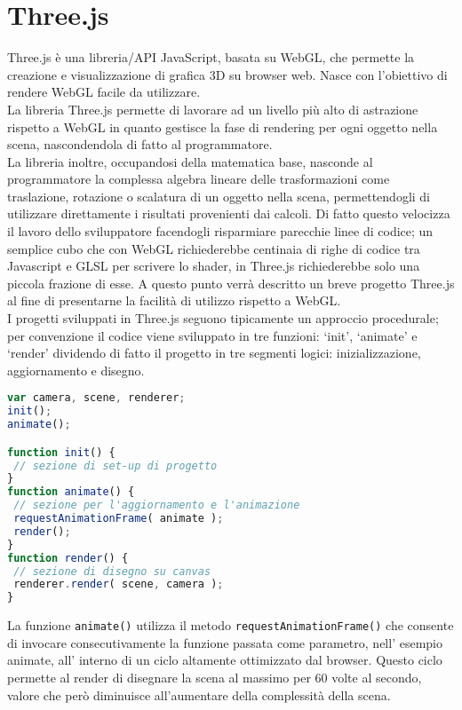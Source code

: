 \section{Three.js}
\label{sec:chapter_tecnologie_abilitanti_threejs}

Three.js è una libreria/API JavaScript, basata su WebGL, che permette la creazione e visualizzazione di grafica 3D su browser web. Nasce con l’obiettivo di rendere WebGL facile da utilizzare. \cite{webgl9}
\\
La libreria Three.js permette di lavorare ad un livello più alto di astrazione rispetto a WebGL in quanto gestisce la fase di rendering per ogni oggetto nella scena, nascondendola di fatto al programmatore.
\\
La libreria inoltre, occupandosi della matematica base, nasconde al programmatore la complessa algebra lineare delle trasformazioni come traslazione, rotazione o scalatura di un oggetto nella scena, permettendogli di utilizzare direttamente i risultati provenienti dai calcoli.
Di fatto questo velocizza il lavoro dello sviluppatore facendogli risparmiare parecchie linee di codice; un semplice cubo che con WebGL richiederebbe centinaia di righe di codice tra Javascript e GLSL per scrivere lo shader, in Three.js richiederebbe solo una piccola frazione di esse.
A questo punto verrà descritto un breve progetto Three.js al fine di presentarne la facilità di utilizzo rispetto a WebGL. \cite{docube,createscene}
\\
I progetti sviluppati in Three.js seguono tipicamente un approccio procedurale; per convenzione il codice viene sviluppato in tre funzioni: ‘init’, ‘animate’ e ‘render’ dividendo di fatto il progetto in tre segmenti logici: inizializzazione, aggiornamento e disegno.
\begin{lstlisting}[language=javascript]
var camera, scene, renderer;
init();
animate();

function init() {
 // sezione di set-up di progetto
}
function animate() {
 // sezione per l'aggiornamento e l'animazione
 requestAnimationFrame( animate );
 render();
}
function render() {
 // sezione di disegno su canvas
 renderer.render( scene, camera );
}
\end{lstlisting}
La funzione \texttt{animate()} utilizza il metodo \texttt{requestAnimationFrame()} che consente di invocare consecutivamente la funzione passata come parametro, nell’ esempio animate, all’ interno di un ciclo altamente ottimizzato dal browser. Questo ciclo permette al render di disegnare la scena al massimo per 60 volte al secondo, valore che però diminuisce all’aumentare della complessità della scena.
